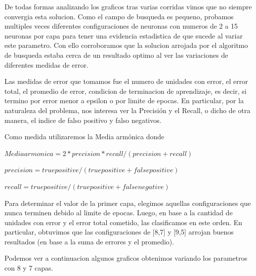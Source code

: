 De todas formas analizando los graficos tras varias corridas vimos que no siempre convergia esta solucion.
Como el campo de busqueda es pequeno, probamos multiples veces diferentes configuraciones de neuronas con numeros de 2 a 15 neuronas por capa para tener una evidencia estadistica de que sucede al variar este parametro. Con ello corroboramos que la solucion arrojada por el algoritmo de busqueda estaba cerca de un resultado optimo al ver las variaciones de diferentes medidas de error. 

Las medidas de error que tomamos fue el numero de unidades con error, el error total, el promedio de error, condicion de terminacion de aprendizaje, es decir, si termino por error menor a epsilon o por limite de epocas. En particular, por la naturaleza del problema, nos interesa ver la Precisión y el Recall, o dicho de otra manera, el indice de falso positivo y falso negativos. 

Como medida utilizaremos la Media armónica donde 

$Media armonica=2*precision*recall/(precision+recall)$

$precision=true positive/(true positive+false positive)$

$recall= true positive/(true positive+false negative)$


Para determinar el valor de la primer capa, elegimos aquellas configuraciones que nunca terminen debido al limite de epocas. Luego, en base a la cantidad de unidades con error y el error total cometido, las clasificamos en este orden. 
En particular, obtuvimos que las configuraciones de [8,7] y [9,5] arrojan buenos resultados (en base a la suma de errores y el promedio).

Podemos ver a continuacion algunos graficos obtenimos variando los parametros con 8 y 7 capas.

